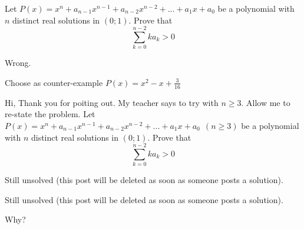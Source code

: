 \begin{solution}
	\begin{tcolorbox}Let $P(x)=x^n+a_{n-1}x^{n-1}+a_{n-2}x^{n-2}+...+a_1x+a_0$ be a polynomial with $n$ distinct real solutions in $(0;1)$. Prove that \[\sum_{k=0}^{n-2} k a_k > 0\]\end{tcolorbox}

Wrong.

Choose as counter-example $P(x)=x^2-x+\frac3{16}$
\end{solution}



\begin{solution}
	Hi,
Thank you for poiting out. My teacher says to try with $n \ge 3$. Allow me to re-state the problem.
Let $P(x)=x^n+a_{n-1}x^{n-1}+a_{n-2}x^{n-2}+...+a_1x+a_0 \ \ (n \ge 3)$ be a polynomial with $n$ distinct real solutions in $(0;1)$. Prove that \[\sum_{k=0}^{n-2} k a_k > 0\]
\end{solution}



\begin{solution}
	Still unsolved (this post will be deleted as soon as someone posts a solution).

\end{solution}



\begin{solution}
	\begin{tcolorbox}Still unsolved (this post will be deleted as soon as someone posts a solution).\end{tcolorbox}

Why?
\end{solution}






